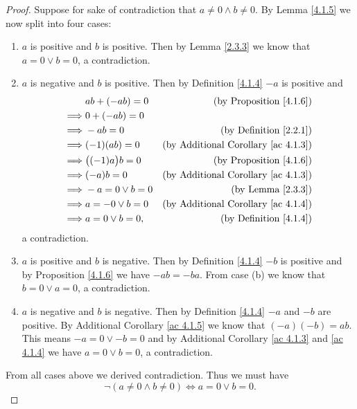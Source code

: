 \begin{proof}
    Suppose for sake of contradiction that \(a \neq 0 \land b \neq 0\).
    By Lemma \ref{4.1.5} we now split into four cases:
    \begin{enumerate}
        \item \(a\) is positive and \(b\) is positive.
              Then by Lemma \ref{2.3.3} we know that \(a = 0 \lor b = 0\), a contradiction.
        \item \(a\) is negative and \(b\) is positive.
              Then by Definition \ref{4.1.4} \(-a\) is positive and
              \begin{align*}
                           & ab + (-ab) = 0       & \text{(by Proposition \ref{4.1.6})}             \\
                  \implies & 0 + (-ab) = 0                                                          \\
                  \implies & -ab = 0              & \text{(by Definition \ref{2.2.1})}              \\
                  \implies & (-1)(ab) = 0         & \text{(by Additional Corollary \ref{ac 4.1.3})} \\
                  \implies & \big((-1)a\big)b = 0 & \text{(by Proposition \ref{4.1.6})}             \\
                  \implies & (-a)b = 0            & \text{(by Additional Corollary \ref{ac 4.1.3})} \\
                  \implies & -a = 0 \lor b = 0    & \text{(by Lemma \ref{2.3.3})}                   \\
                  \implies & a = -0 \lor b = 0    & \text{(by Additional Corollary \ref{ac 4.1.4})} \\
                  \implies & a = 0 \lor b = 0,    & \text{(by Definition \ref{4.1.4})}
              \end{align*}
              a contradiction.
        \item \(a\) is positive and \(b\) is negative.
              Then by Definition \ref{4.1.4} \(-b\) is positive and by Proposition \ref{4.1.6} we have \(-ab = -ba\).
              From case (b) we know that \(b = 0 \lor a = 0\), a contradiction.
        \item \(a\) is negative and \(b\) is negative.
              Then by Definition \ref{4.1.4} \(-a\) and \(-b\) are positive.
              By Additional Corollary \ref{ac 4.1.5} we know that \((-a)(-b) = ab\).
              This means \(-a = 0 \lor -b = 0\) and by Additional Corollary \ref{ac 4.1.3} and \ref{ac 4.1.4} we have \(a = 0 \lor b = 0\), a contradiction.
    \end{enumerate}
    From all cases above we derived contradiction.
    Thus we must have
    \[
        \lnot(a \neq 0 \land b \neq 0) \iff a = 0 \lor b = 0.
    \]
\end{proof}

